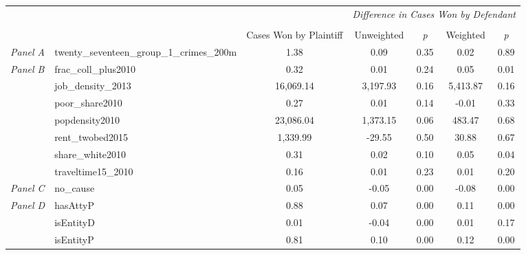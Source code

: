 \begin{tabular}{llccccc}
\toprule
 &  & \textit{} & \multicolumn{4}{c}{\textit{Difference in Cases Won by Defendant}} \\
\cline{4-7}
\\
 &  & Cases Won by Plaintiff & Unweighted & \emph{p} & Weighted & \emph{p} \\
\midrule
\textit{Panel A} & twenty_seventeen_group_1_crimes_200m & 1.38 & 0.09 & 0.35 & 0.02 & 0.89 \\
\cline{1-7}
\multirow[c]{7}{3cm}{\textit{Panel B}} & frac_coll_plus2010 & 0.32 & 0.01 & 0.24 & 0.05 & 0.01 \\
 & job_density_2013 & 16,069.14 & 3,197.93 & 0.16 & 5,413.87 & 0.16 \\
 & poor_share2010 & 0.27 & 0.01 & 0.14 & -0.01 & 0.33 \\
 & popdensity2010 & 23,086.04 & 1,373.15 & 0.06 & 483.47 & 0.68 \\
 & rent_twobed2015 & 1,339.99 & -29.55 & 0.50 & 30.88 & 0.67 \\
 & share_white2010 & 0.31 & 0.02 & 0.10 & 0.05 & 0.04 \\
 & traveltime15_2010 & 0.16 & 0.01 & 0.23 & 0.01 & 0.20 \\
\cline{1-7}
\textit{Panel C} & no_cause & 0.05 & -0.05 & 0.00 & -0.08 & 0.00 \\
\cline{1-7}
\multirow[c]{3}{3cm}{\textit{Panel D}} & hasAttyP & 0.88 & 0.07 & 0.00 & 0.11 & 0.00 \\
 & isEntityD & 0.01 & -0.04 & 0.00 & 0.01 & 0.17 \\
 & isEntityP & 0.81 & 0.10 & 0.00 & 0.12 & 0.00 \\
\cline{1-7}
\bottomrule
\end{tabular}
